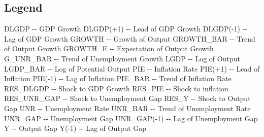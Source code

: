 \documentclass{article}%
\begin{document}
%
\subsection{Legend}%
\label{subsec:Legend}%
DLGDP       {-}{-}  GDP Growth\newline%
DLGDP(+1)   {-}{-}  Lead of GDP Growth\newline%
DLGDP({-}1)   {-}{-}  Lag of GDP Growth\newline%
GROWTH      {-}{-}  Growth of Output\newline%
GROWTH\_BAR  {-}{-}  Trend of Output Growth\newline%
GROWTH\_E    {-}{-}  Expectation of Output Growth\newline%
G\_UNR\_BAR   {-}{-}  Trend of Unemployment Growth\newline%
LGDP        {-}{-}  Log of Output\newline%
LGDP\_BAR    {-}{-}  Log of Potential Output\newline%
PIE         {-}{-}  Inflation Rate\newline%
PIE(+1)     {-}{-}  Lead of Inflation\newline%
PIE({-}1)     {-}{-}  Lag of Inflation\newline%
PIE\_BAR     {-}{-}  Trend of Inflation Rate\newline%
RES\_DLGDP   {-}{-}  Shock to GDP Growth\newline%
RES\_PIE     {-}{-}  Shock to inflation\newline%
RES\_UNR\_GAP  {-}{-}  Shock to Unemployment Gap\newline%
RES\_Y       {-}{-}  Shock to Output Gap\newline%
UNR         {-}{-}  Unemployment Rate\newline%
UNR\_BAR     {-}{-}  Trend of Unemployment Rate\newline%
UNR\_GAP     {-}{-}  Unemployment Gap\newline%
UNR\_GAP({-}1)  {-}{-}  Lag of Unemployment Gap\newline%
Y           {-}{-}  Output Gap\newline%
Y({-}1)       {-}{-}  Lag of Output Gap

%
\end{document}
